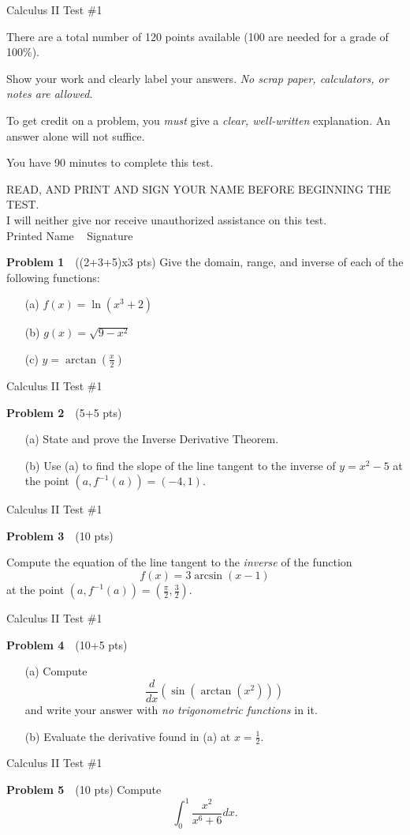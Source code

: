 \documentclass[10pt]{article}
\newcommand{\prob}[1]{\vspace{10mm} \noindent \textbf{Problem #1} \,\,}
\newcommand{\header}{
\begin{center}
Calculus II Test \#1
\end{center}

\vspace{2mm}

}
\newcommand{\intro}{
\noindent There are a total number of 120 points available (100 are needed for a grade of 100\%).

\noindent Show your work and clearly label your answers. \emph{No scrap paper, calculators, or notes are allowed}. 

\noindent To get credit on a problem, you \emph{must} give a \emph{clear, well-written} explanation. An answer alone will not suffice.

\noindent You have 90 minutes to complete this test. 
\bigskip

\noindent READ, AND PRINT AND SIGN YOUR NAME BEFORE BEGINNING THE TEST. \\
I will neither give nor receive unauthorized assistance on this test. \\
Printed Name \underline{\hspace{50mm}} \,\,\, Signature \underline{\hspace{50mm}}
}
\begin{document}


\header

\intro

\vspace{20mm}

\prob{1} ((2+3+5)x3 pts) Give the domain, range, and inverse of each of the following functions: 
\begin{itemize}
\item[(a) ] $f(x) = \ln(x^3 + 2)$
\item[(b) ] $g(x) = \sqrt{9 - x^2}$
\item[(c) ] $y = \arctan\left(\frac{x}{2}\right)$
\end{itemize}

\pagebreak 

\header

\prob{2} (5+5 pts)
\begin{itemize}
\item[(a) ] State and prove the Inverse Derivative Theorem.
\item[(b) ] Use (a) to find the slope of the line tangent to the inverse of $y = x^2 - 5$ at the point $(a, f^{-1}(a)) = (-4,1)$. 
\end{itemize}

\pagebreak

\header

\prob{3} (10 pts) %

Compute the equation of the line tangent to the \emph{inverse} of the function 
\[ f(x) = 3 \arcsin(x-1) \] at the point $(a, f^{-1}(a)) = (\frac{\pi}{2}, \frac{3}{2})$. 

\pagebreak

\header

\prob{4} (10+5 pts) %
\begin{itemize}
\item[(a) ] Compute \[ \frac{d}{dx} \left( \sin( \arctan(x^2) ) \right) \]
and write your answer with \emph{no trigonometric functions} in it.
\item[(b) ] Evaluate the derivative found in (a) at $x = \frac{1}{2}$.
\end{itemize}

\pagebreak

\header

\prob{5} (10 pts) %
Compute \[ \int_0^1 \frac{x^2}{x^6 + 6} dx. \]

\pagebreak 
\end{document}
